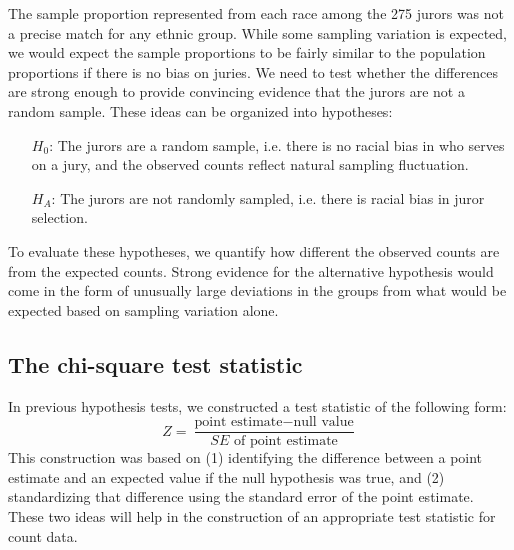 The sample proportion represented from each race among the 275 jurors was not a precise match for any ethnic group. While some sampling variation is expected, we would expect the sample proportions to be fairly similar to the population proportions if there is no bias on juries. We need to test whether the differences are strong enough to provide convincing evidence that the jurors are not a random sample. These ideas can be organized into hypotheses:
\begin{itemize}
\setlength{\itemsep}{0mm}
\item[$H_0$:] The jurors are a random sample, i.e. there is no racial bias in who serves on a jury, and the observed counts reflect natural sampling fluctuation.
\item[$H_A$:] The jurors are not randomly sampled, i.e. there is racial bias in juror selection.
\end{itemize}
To evaluate these hypotheses, we quantify how different the observed counts are from the expected counts. Strong evidence for the alternative hypothesis would come in the form of unusually large deviations in the groups from what would be expected based on sampling variation alone.


\subsection{The chi-square test statistic}
\label{chiSquareTestStatistic}

In previous hypothesis tests, we constructed a test statistic of the following form:
$$ Z = \frac{\text{point estimate} - \text{null value}}{SE \text{ of point estimate}} $$
This construction was based on (1) identifying the difference between a point estimate and an expected value if the null hypothesis was true, and (2) standardizing that difference using the standard error of the point estimate. These two ideas will help in the construction of an appropriate test statistic for count data.

